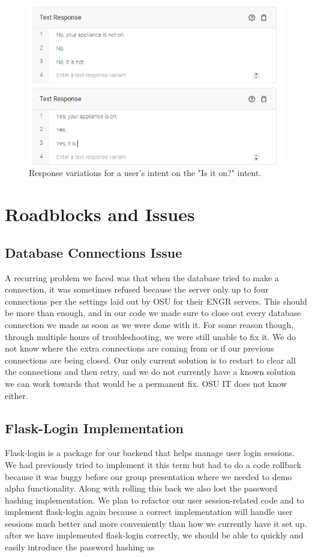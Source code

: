 \documentclass[onecolumn, draftclsnofoot,10pt, compsoc]{IEEEtran}
\begin{document}
\begin{figure}
    \centering
    \includegraphics{applianceResponse.PNG}
    \caption{Response variations for a user's intent on the "Is it on?" intent.}
\end{figure}


\section{Roadblocks and Issues}

\subsection{Database Connections Issue}
A recurring problem we faced was that when the database tried to make a connection, it was sometimes refused because the server only up to four connections per the settings laid out by OSU for their ENGR servers. This should be more than enough, and in our code we made sure to close out every database connection we made as soon as we were done with it. For some reason though, through multiple hours of troubleshooting, we were still unable to fix it. We do not know where the extra connections are coming from or if our previous connections are being closed. Our only current solution is to restart to clear all the connections and then retry, and we do not currently have a known solution we can work towards that would be a permanent fix. OSU IT does not know either. 

\subsection{Flask-Login Implementation}
Flask-login is a package for our backend that helps manage user login sessions. We had previously tried to implement it this term but had to do a code rollback because it was buggy before our group presentation where we needed to demo alpha functionality. Along with rolling this back we also lost the password hashing implementation. We plan to refactor our user session-related code and to implement flask-login again because a correct implementation will handle user sessions much better and more conveniently than how we currently have it set up. after we have implemented flask-login correctly, we should be able to quickly and easily introduce the password hashing as 
\end{document}
